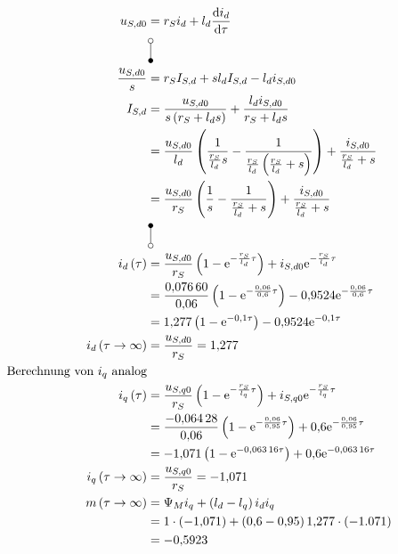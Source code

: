 \documentclass[11pt,a4paper]{scrartcl}
\newcommand{\mybr}[1]{\left(#1\right)}
\newcommand{\0}{_{\mybr{0}}}
\newcommand{\1}{_{\mybr{1}}}
\newcommand{\2}{_{\mybr{2}}}
\renewcommand{\e}{\mathrm{e}}
\renewcommand{\d}{\mathrm{d}}
\begin{document}
\subsection{}
\begin{align}
u_{S,d0}&=r_S i_d+l_d\frac{\d i_d}{\d\tau}\\
&\rotatebox[origin=c]{270}{\laplace}\nonumber\\
\frac{u_{S,d0}}{s}&=r_S I_{S,d}+s l_d I_{S,d}-l_d i_{S,d0}\\
I_{S,d}&=\frac{u_{S,d0}}{s\mybr{r_S+l_d s}}+\frac{l_d i_{S,d0}}{r_S+l_d s}\\
&=\frac{u_{S,d0}}{l_d}\mybr{\frac{1}{\frac{r_S}{l_d}s}-\frac{1}{\frac{r_S}{l_d}\mybr{\frac{r_S}{l_d}+s}}}+\frac{i_{S,d0}}{\frac{r_S}{l_d}+s}\\
&=\frac{u_{S,d0}}{r_S}\mybr{\frac{1}{s}-\frac{1}{\frac{r_S}{l_d}+s}}+\frac{i_{S,d0}}{\frac{r_S}{l_d}+s}\\
&\rotatebox[origin=c]{270}{\Laplace}\nonumber\\
i_d\mybr{\tau}&=\frac{u_{S,d0}}{r_S}\mybr{1-\e^{-\frac{r_S}{l_d}\tau}}+i_{S,d0}\e^{-\frac{r_S}{l_d}\tau}\\
&=\frac{\num{0.07660}}{\num{0.06}}\mybr{1-\e^{-\frac{\num{0.06}}{\num{0.6}}\tau}}-\num{0.9524}\e^{-\frac{\num{0.06}}{\num{0.6}}\tau}\\
&=\num{1.277}\mybr{1-\e^{\num{-0.1}\tau}}-\num{0.9524}\e^{\num{-0.1}\tau}\\
i_d\mybr{\tau\rightarrow\infty}&=\frac{u_{S,d0}}{r_S}=\num{1.277}\\
\text{Berechnung von $i_q$ analog}\\
i_q\mybr{\tau}&=\frac{u_{S,q0}}{r_S}\mybr{1-\e^{-\frac{r_S}{l_q}\tau}}+i_{S,q0}\e^{-\frac{r_S}{l_q}\tau}\\
&=\frac{\num{-0.06428}}{\num{0.06}}\mybr{1-\e^{-\frac{\num{0.06}}{\num{0.95}}\tau}}+\num{0.6}\e^{-\frac{\num{0.06}}{\num{0.95}}\tau}\\
&=\num{-1.071}\mybr{1-\e^{\num{-0.06316}\tau}}+\num{0.6}\e^{\num{-0.06316}\tau}\\
i_q\mybr{\tau\rightarrow\infty}&=\frac{u_{S,q0}}{r_S}=\num{-1.071}\\
m\mybr{\tau\rightarrow\infty}&=\Psi_M i_q+\mybr{l_d-l_q}i_d i_q\\
&=1\cdot\mybr{\num{-1.071}
}+\mybr{\num{0.6}-\num{0.95}}\num{1.277}\cdot\mybr{-1.071}\\
&=\num{-0.5923}
\end{align}
\end{document}
